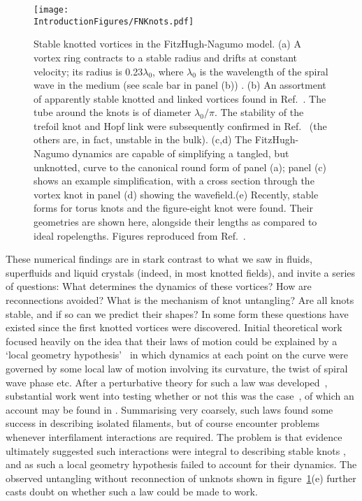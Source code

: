 \begin{figure}[htbp]
\centering
\texttt{[image: \\IntroductionFigures/FNKnots.pdf]}
\caption{Stable knotted vortices in the FitzHugh-Nagumo model. (a) A vortex ring contracts to a stable radius and drifts at constant velocity; its radius is 0.23$\lambda_0$, where $\lambda_0$ is the wavelength of the spiral wave in the medium (see scale bar in panel (b)) . (b) An assortment of apparently stable knotted and linked vortices found in Ref.~\citep{Henze1993}. The tube around the knots is of diameter $\lambda_0/\pi$. The stability of the trefoil knot and Hopf link were subsequently confirmed in Ref.~\citep{Sutcliffe2003} (the others are, in fact, unstable in the bulk). (c,d) The FitzHugh-Nagumo dynamics are capable of simplifying a tangled, but unknotted, curve to the canonical round form of panel (a); panel (c) shows an example simplification, with a cross section through the vortex knot in panel (d) showing the wavefield.(e) Recently, stable forms for torus knots and the figure-eight knot were found. Their geometries are shown here, alongside their lengths as compared to ideal ropelengths. Figures reproduced from Ref.~\citep{Winfree1990,WinfreeChapter,Maucher2016,Maucher2017}.}
\label{fig:FNKnots}
\end{figure}
These numerical findings are in stark contrast to what we saw in fluids, superfluids and liquid crystals (indeed, in most knotted fields), and invite a series of questions: What determines the dynamics of these vortices? How are reconnections avoided? What is the mechanism of knot untangling? Are all knots stable, and if so can we predict their shapes? In some form these questions have existed since the first knotted vortices were discovered. Initial theoretical work focused heavily on the idea that their laws of motion could be explained by a `local geometry hypothesis'~\citep{Keener1988,Keener1992,Biktashev1994,Henry2002,Echebarria2006,Dierckx2010} in which dynamics at each point on the curve were governed by some local law of motion involving its curvature, the twist of spiral wave phase etc. After a perturbative theory for such a law was developed~\citep{Keener1988,Keener1992, Biktashev1994}, substantial work went into testing whether or not this was the case~\citep{Winfree1990,Henze1993}, of which an account may be found in \citep{WinfreeChapter}. Summarising very coarsely, such laws found some success in describing isolated filaments, but of course encounter problems whenever interfilament interactions are required. The problem is that evidence ultimately suggested such interactions were integral to describing stable knots \citep{Henze1993,WinfreeChapter}, and as such a local geometry hypothesis failed to account for their dynamics. The observed untangling without reconnection of unknots shown in figure~\ref{fig:FNKnots}(e) \citep{Maucher2016} further casts doubt on whether such a law could be made to work. 

